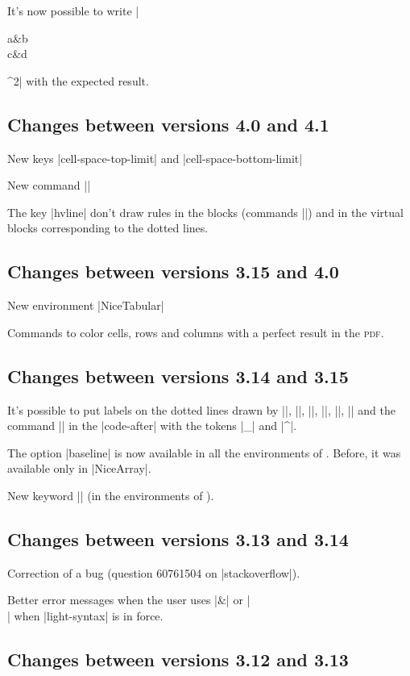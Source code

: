 \documentclass[dvipsnames]{article}%
\begin{document}
It's now possible to write |\begin{pNiceMatrix}a&b\\c&d\end{pNiceMatrix}^2|
with the expected result.

\subsection*{Changes between versions 4.0 and 4.1}

New keys |cell-space-top-limit| and |cell-space-bottom-limit|

New command |\diagbox|

The key |hvline| don't draw rules in the blocks (commands |\Block|) and in the
virtual blocks corresponding to the dotted lines.

\subsection*{Changes between versions 3.15 and 4.0}

New environment |{NiceTabular}|

Commands to color cells, rows and columns with a perfect result in the \textsc{pdf}.

\subsection*{Changes between versions 3.14 and 3.15}

It's possible to put labels on the dotted lines drawn by |\Ldots|, |\Cdots|,
|\Vdots|, |\Ddots|, |\Iddots|, |\Hdotsfor| and the command |\line| in the
|code-after| with the tokens |_| and |^|.

The option |baseline| is now available in all the environments of
. Before, it was available only in |{NiceArray}|.

New keyword |\CodeAfter| (in the environments of ).

\subsection*{Changes between versions 3.13 and 3.14}

Correction of a bug (question 60761504 on |stackoverflow|).

Better error messages when the user uses |&| or |\\| when |light-syntax| is in
force. 

\subsection*{Changes between versions 3.12 and 3.13}
\end{document}
